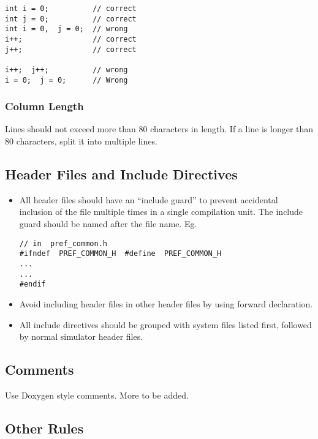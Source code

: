 \smallskip
\begin{lstlisting}
int i = 0;          // correct 
int j = 0;          // correct
int i = 0,  j = 0;  // wrong 
i++;                // correct
j++;                // correct

i++;  j++;          // wrong 
i = 0;  j = 0;      // Wrong
\end{lstlisting}
\smallskip



\subsubsection{Column Length}

Lines should not exceed more than 80 characters in length.  If a line
is longer than 80 characters, split it into multiple lines.


\subsection{Header Files and Include Directives}

\begin{itemize}

  \item All header files should have an ``include guard'' to prevent
  accidental inclusion of the file multiple times in a single
  compilation unit.  The include guard should be named after the file
  name.  Eg.

\smallskip
\begin{lstlisting}
// in  pref_common.h
#ifndef  PREF_COMMON_H  #define  PREF_COMMON_H
...
...
#endif
\end{lstlisting}
\smallskip


  \item Avoid including header files in other header files by using
  forward declaration.

  \item All include directives should be grouped with system files
  listed first, followed by normal simulator header files.
\end{itemize}

\subsection{Comments}

Use Doxygen style comments. More to be added.


\subsection{Other Rules}

